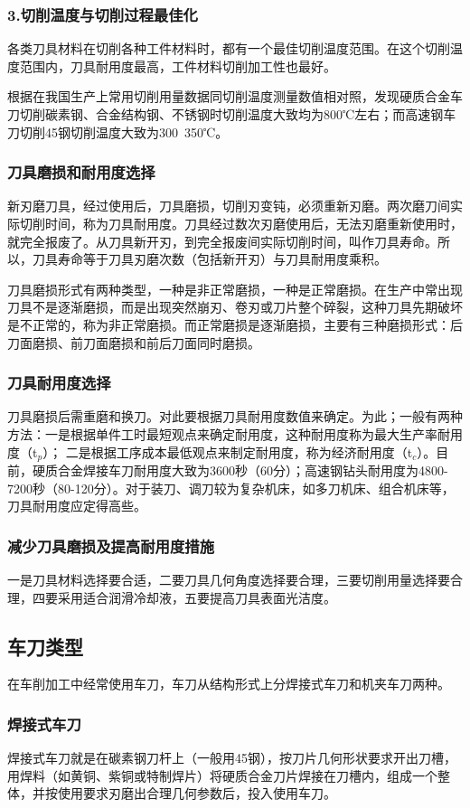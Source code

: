 \documentclass{ctexbook}
\begin{document}
\subsubsection{3.切削温度与切削过程最佳化}
各类刀具材料在切削各种工件材料时，都有一个最佳切削温度范围。在这个切削温度范围内，刀具耐用度最高，工件材料切削加工性也最好。

根据在我国生产上常用切削用量数据同切削温度测量数值相对照，发现硬质合金车刀切削碳素钢、合金结构钢、不锈钢时切削温度大致均为800℃左右；而高速钢车刀切削45钢切削温度大致为300~350℃。
\subsubsection{刀具磨损和耐用度选择}
新刃磨刀具，经过使用后，刀具磨损，切削刃变钝，必须重新刃磨。两次磨刀间实际切削时间，称为刀具耐用度。刀具经过数次刃磨使用后，无法刃磨重新使用时，就完全报废了。从刀具新开刃，到完全报废间实际切削时间，叫作刀具寿命。所以，刀具寿命等于刀具刃磨次数（包括新开刃）与刀具耐用度乘积。

刀具磨损形式有两种类型，一种是非正常磨损，一种是正常磨损。在生产中常出现刀具不是逐渐磨损，而是出现突然崩刃、卷刃或刀片整个碎裂，这种刀具先期破坏是不正常的，称为非正常磨损。而正常磨损是逐渐磨损，主要有三种磨损形式：后刀面磨损、前刀面磨损和前后刀面同时磨损。

\subsubsection{刀具耐用度选择}
刀具磨损后需重磨和换刀。对此要根据刀具耐用度数值来确定。为此；一般有两种方法：一是根据单件工时最短观点来确定耐用度，这种耐用度称为最大生产率耐用度（t$_{p}$）；
二是根据工序成本最低观点来制定耐用度，称为经济耐用度（t$_{c}$）。目前，硬质合金焊接车刀耐用度大致为3600秒（60分）；高速钢钻头耐用度为4800-7200秒（80-120分）。对于装刀、调刀较为复杂机床，如多刀机床、组合机床等，刀具耐用度应定得高些。
\subsubsection{减少刀具磨损及提高耐用度措施}
一是刀具材料选择要合适，二要刀具几何角度选择要合理，三要切削用量选择要合理，四要采用适合润滑冷却液，五要提高刀具表面光洁度。
\subsection{车刀类型}
在车削加工中经常使用车刀，车刀从结构形式上分焊接式车刀和机夹车刀两种。
\subsubsection{焊接式车刀}
焊接式车刀就是在碳素钢刀杆上（一般用45钢），按刀片几何形状要求开出刀槽，用焊料（如黄铜、紫铜或特制焊片）将硬质合金刀片焊接在刀槽内，组成一个整体，并按使用要求刃磨出合理几何参数后，投入使用车刀。
\end{document}
